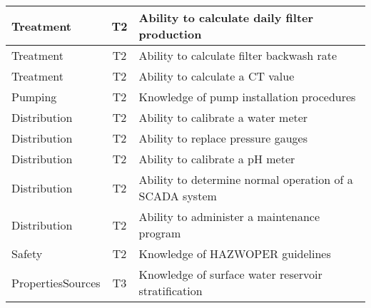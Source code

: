 \documentclass{article}
\begin{document}
\begin{table}[]
\begin{tabular}{|l|c|l|}
Treatment                              & T2             & Ability to calculate   daily filter production                                                                                    \\ \hline
Treatment                              & T2             & Ability to calculate   filter backwash rate                                                                                       \\ \hline
Treatment                              & T2             & Ability to calculate   a CT value                                                                                                 \\ \hline
Pumping                                & T2             & Knowledge of pump   installation procedures                                                                                       \\ \hline
Distribution                           & T2             & Ability to calibrate   a water meter                                                                                              \\ \hline
Distribution                           & T2             & Ability to replace   pressure gauges                                                                                              \\ \hline
Distribution                           & T2             & Ability to calibrate   a pH meter                                                                                                 \\ \hline
Distribution                           & T2             & Ability to determine   normal operation of a SCADA system                                                                         \\ \hline
Distribution                           & T2             & Ability to administer   a maintenance program                                                                                     \\ \hline
Safety                                 & T2             & Knowledge of HAZWOPER   guidelines                                                                                                \\ \hline
PropertiesSources                      & T3             & Knowledge of surface   water reservoir stratification                                                                             \\ \hline

\end{tabular}
\end{table}
\end{document}
